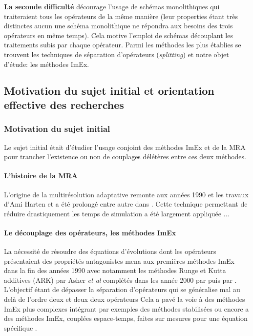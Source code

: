     \textbf{La seconde difficulté} décourage l'usage de schémas monolithiques qui traiteraient tous les opérateurs de la même manière 
    (leur properties étant très distinctes aucun une schéma monolithique ne répondra aux besoins des trois opérateurs en même temps).
    Cela motive l'emploi de schémas découplant les traitements subis par chaque opérateur. Parmi les méthodes les plus établies se trouvent 
    les techniques de séparation d'opérateurs (\textit{splitting}) et notre objet d'étude: les méthodes ImEx.

\subsection{Motivation du sujet initial et orientation effective des recherches}
    \subsubsection{Motivation du sujet initial}
    Le sujet initial était d'étudier l'usage conjoint des méthodes ImEx et de la MRA pour trancher l’existence ou non de couplages délétères entre ces deux méthodes.\par 

    \paragraph{L'histoire de la MRA}
    L'origine de la multirésolution adaptative remonte aux années 1990 et les travaux d'Ami Harten \cite{harten1994} et a été prolongé entre autre dans \cite{Kaibara2001,Cohen2003}.
    Cette technique permettant de réduire drastiquement les temps de simulation a été largement appliquée \cite{}...

    \paragraph{Le découplage des opérateurs, les méthodes ImEx}
    La nécessité de résoudre des équations d'évolutions dont les opérateurs présentaient des propriétés antagonistes mena aux premières méthodes ImEx dans la fin des années 1990 
    avec notamment les méthodes Runge et Kutta additives (ARK) par Asher \textit{et al} \cite{ASCHER1997151} complétés dans les année 2000 par \cite{KENNEDY2003139} puis par \cite{FITZHUGH1961445}. 
    L'objectif étant de dépasser la séparation d'opérateurs \cite{Strang1968} qui se généralise mal au delà de l'ordre deux et deux deux opérateurs \cite{}%
    Cela a pavé la voie à des méthodes ImEx plus complexes intégrant par exemples des méthodes stabilisées \cite{Abdulle2013} 
    ou encore a des méthodes ImEx, couplées espace-temps, faites sur mesures pour une équation spécifique \cite{rebou2024}.

